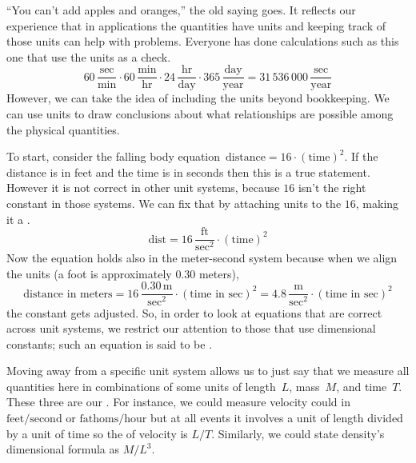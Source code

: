 ``You can't add apples and oranges,'' the old saying goes.
It reflects our experience that in applications the quantities
have units and keeping track of those units can help with problems.
Everyone has done calculations such as this one 
that use the units as a check.
\begin{equation*}
  60\,\frac{\text{sec}}{\text{min}}
  \cdot 60\,\frac{\text{min}}{\text{hr}}
  \cdot 24\,\frac{\text{hr}}{\text{day}}
  \cdot 365\,\frac{\text{day}}{\text{year}}
  = 31\,536\,000\,\frac{\text{sec}}{\text{year}}
\end{equation*}
However, we can take the idea of including the units beyond bookkeeping.
We can use units to draw conclusions
about what relationships are possible among the physical quantities.

To start, consider the falling body 
equation~$\text{distance}=16\cdot(\text{time})^2$.
If the distance is in feet and the time is in seconds then this is a 
true statement. 
However
it is not correct in other unit systems, because $16$ isn't the
right constant in those systems.  
We can fix that by attaching units to the $16$, making it a 
.
\begin{equation*}
  \text{dist}=16\,\frac{\text{ft}}{\text{sec}^2}\cdot (\text{time})^2
\end{equation*}  
Now the equation holds also in the meter-second system   
because when we align the units (a foot is approximately $0.30$ meters), 
\begin{equation*}
  \text{distance in meters}=16\,\frac{0.30\,\text{m}}{\text{sec}^2}
                    \cdot (\text{time in sec})^2
                   =4.8\,\frac{\text{m}}{\text{sec}^2}
                    \cdot (\text{time in sec})^2
\end{equation*}
the constant gets adjusted.
So, in order to look at equations that are correct across unit systems, 
we restrict our attention
to those that use dimensional constants; such
an equation is said to be .

Moving away from a specific unit system allows us to just say that 
we measure all quantities here in combinations
of some units of length~$L$, mass~$M$, and time~$T$.
These three are our
.
For instance, we could measure velocity 
could in $\text{feet}/\text{second}$
or $\text{fathoms}/\text{hour}$ but at all events it involves
a unit of length divided by a unit of time
so the  
of velocity is $L/T$.
Similarly, we could state density's dimensional formula as $M/L^3$.

